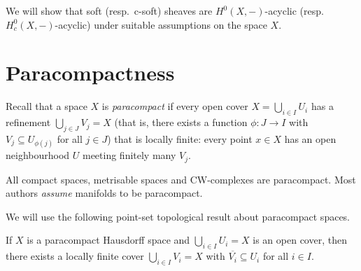 We will show that soft (resp.~c-soft) sheaves are \(H^0(X,-)\)-acyclic (resp.~\(H^0_c(X,-)\)-acyclic) under suitable assumptions on the space \(X\).

\section{Paracompactness}
\noindent
Recall that a space \(X\) is \emph{paracompact} if every open cover \(X=\bigcup_{i\in I}U_i\) has a refinement \(\bigcup_{j\in J}V_j=X\) (that is, there exists a function \(\phi\colon J\to I\) with \(V_j\subseteq U_{\phi(j)}\) for all \(j\in J\)) that is locally finite: every point \(x\in X\) has an open neighbourhood \(U\) meeting finitely many \(V_j\).

\begin{exmp}
All compact spaces, metrisable spaces and CW-complexes are paracompact.
Most authors \emph{assume} manifolds to be paracompact.
\end{exmp}

We will use the following point-set topological result about paracompact spaces.

\begin{lem}[name={\cite[Lemma~41.6]{MunkresTopology}}]\label{lem:paracompact-locally-finite-cover}
If \(X\) is a paracompact Hausdorff space and \(\bigcup_{i\in I}U_i=X\) is an open cover, then there exists a locally finite cover \(\bigcup_{i\in I}V_i=X\) with \(\overline{V_i}\subseteq U_i\) for all \(i\in I\).
\end{lem}

